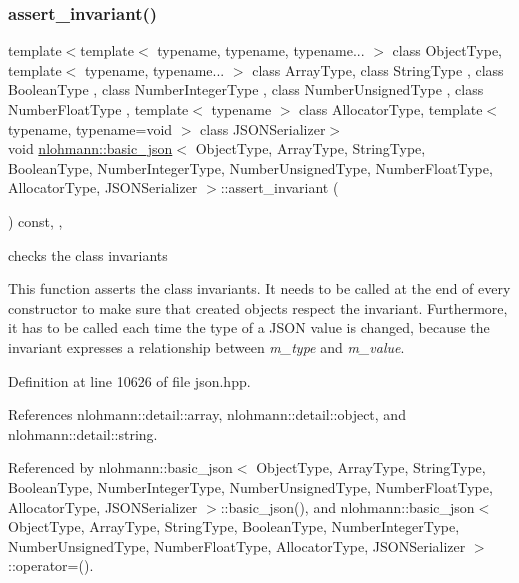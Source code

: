 \subsubsection{\texorpdfstring{assert\+\_\+invariant()}{assert\_invariant()}}
{\footnotesize\ttfamily template$<$template$<$ typename, typename, typename... $>$ class Object\+Type, template$<$ typename, typename... $>$ class Array\+Type, class String\+Type , class Boolean\+Type , class Number\+Integer\+Type , class Number\+Unsigned\+Type , class Number\+Float\+Type , template$<$ typename $>$ class Allocator\+Type, template$<$ typename, typename=void $>$ class J\+S\+O\+N\+Serializer$>$ \\
void \hyperlink{classnlohmann_1_1basic__json}{nlohmann\+::basic\+\_\+json}$<$ Object\+Type, Array\+Type, String\+Type, Boolean\+Type, Number\+Integer\+Type, Number\+Unsigned\+Type, Number\+Float\+Type, Allocator\+Type, J\+S\+O\+N\+Serializer $>$\+::assert\+\_\+invariant (\begin{DoxyParamCaption}{ }\end{DoxyParamCaption}) const\hspace{0.3cm}{\ttfamily [inline]}, {\ttfamily [private]}, {\ttfamily [noexcept]}}



checks the class invariants 

This function asserts the class invariants. It needs to be called at the end of every constructor to make sure that created objects respect the invariant. Furthermore, it has to be called each time the type of a J\+S\+ON value is changed, because the invariant expresses a relationship between {\itshape m\+\_\+type} and {\itshape m\+\_\+value}. 

Definition at line 10626 of file json.\+hpp.



References nlohmann\+::detail\+::array, nlohmann\+::detail\+::object, and nlohmann\+::detail\+::string.



Referenced by nlohmann\+::basic\+\_\+json$<$ Object\+Type, Array\+Type, String\+Type, Boolean\+Type, Number\+Integer\+Type, Number\+Unsigned\+Type, Number\+Float\+Type, Allocator\+Type, J\+S\+O\+N\+Serializer $>$\+::basic\+\_\+json(), and nlohmann\+::basic\+\_\+json$<$ Object\+Type, Array\+Type, String\+Type, Boolean\+Type, Number\+Integer\+Type, Number\+Unsigned\+Type, Number\+Float\+Type, Allocator\+Type, J\+S\+O\+N\+Serializer $>$\+::operator=().


